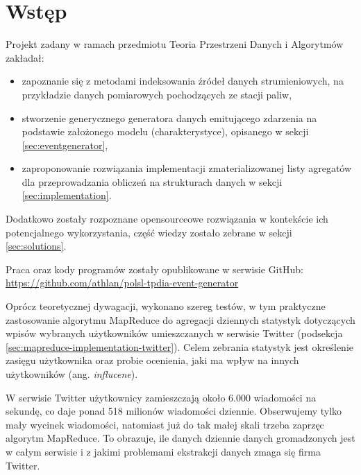 \section{Wstęp}
\label{sec:intro}

Projekt zadany w ramach przedmiotu Teoria Przestrzeni Danych i Algorytmów zakładał:

\begin{itemize}[noitemsep]
  \item zapoznanie się z metodami indeksowania źródeł danych strumieniowych, na przykładzie danych pomiarowych pochodzących ze stacji paliw,
  \item stworzenie generycznego generatora danych emitującego zdarzenia na podstawie założonego modelu (charakterystyce), opisanego w sekcji \ref{sec:eventgenerator},
  \item zaproponowanie rozwiązania implementacji zmaterializowanej listy agregatów dla przeprowadzania obliczeń na strukturach danych w sekcji \ref{sec:implementation}.
\end{itemize}

Dodatkowo zostały rozpoznane opensourceowe rozwiązania w kontekście ich potencjalnego wykorzystania, część wiedzy zostało zebrane w sekcji \ref{sec:solutions}.

Praca oraz kody programów zostały opublikowane w serwisie GitHub:\\
\url{https://github.com/athlan/polsl-tpdia-event-generator}

Oprócz teoretycznej dywagacji, wykonano szereg testów, w tym praktyczne zastosowanie algorytmu MapReduce do agregacji dziennych statystyk dotyczących wpisów wybranych użytkowników umieszczanych w serwisie Twitter (podsekcja \ref{sec:mapreduce-implementation-twitter}). Celem zebrania statystyk jest określenie zasięgu użytkownika oraz probie ocenienia, jaki ma wpływ na innych użytkowników (ang. \emph{influcene}).

W serwisie Twitter użytkownicy zamieszczają około 6.000 wiadomości na sekundę, co daje ponad 518 milionów wiadomości dziennie. Obserwujemy tylko mały wycinek wiadomości, natomiast już do tak małej skali trzeba zaprzęc algorytm MapReduce. To obrazuje, ile danych dziennie danych gromadzonych jest w całym serwisie i z jakimi problemami ekstrakcji danych zmaga się firma Twitter.
